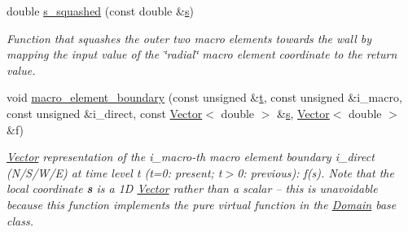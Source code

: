 \begin{DoxyCompactItemize}
double \hyperlink{classoomph_1_1QuarterCircleSectorDomain_a5b66f846233b3cf976ed63d9bf54f0c7}{s\+\_\+squashed} (const double \&\hyperlink{cfortran_8h_ab7123126e4885ef647dd9c6e3807a21c}{s})
\begin{DoxyCompactList}\small\item\em Function that squashes the outer two macro elements towards the wall by mapping the input value of the \char`\"{}radial\char`\"{} macro element coordinate to the return value. \end{DoxyCompactList}\item 
void \hyperlink{classoomph_1_1QuarterCircleSectorDomain_a9faddf9d13e0a7633f732bac1ddda80b}{macro\+\_\+element\+\_\+boundary} (const unsigned \&\hyperlink{cfortran_8h_af6f0bd3dc13317f895c91323c25c2b8f}{t}, const unsigned \&i\+\_\+macro, const unsigned \&i\+\_\+direct, const \hyperlink{classoomph_1_1Vector}{Vector}$<$ double $>$ \&\hyperlink{cfortran_8h_ab7123126e4885ef647dd9c6e3807a21c}{s}, \hyperlink{classoomph_1_1Vector}{Vector}$<$ double $>$ \&f)
\begin{DoxyCompactList}\small\item\em \hyperlink{classoomph_1_1Vector}{Vector} representation of the i\+\_\+macro-\/th macro element boundary i\+\_\+direct (N/\+S/\+W/E) at time level t (t=0\+: present; t$>$0\+: previous)\+: f(s). Note that the local coordinate {\bfseries s} is a 1D \hyperlink{classoomph_1_1Vector}{Vector} rather than a scalar -- this is unavoidable because this function implements the pure virtual function in the \hyperlink{classoomph_1_1Domain}{Domain} base class. \end{DoxyCompactList}\end{DoxyCompactItemize}

